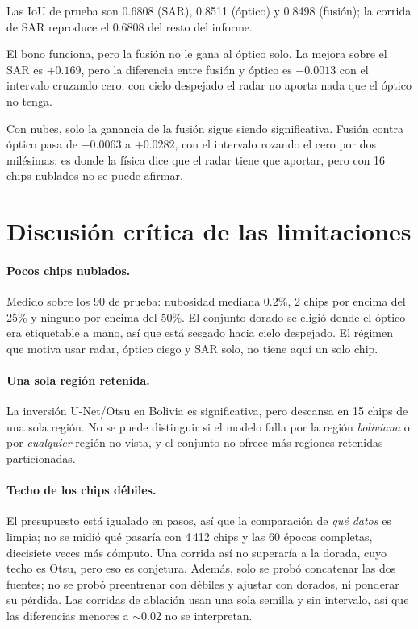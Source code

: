 \documentclass{article}
\begin{document}
Las IoU de prueba son 0.6808 (SAR), 0.8511 (óptico) y 0.8498 (fusión); la corrida
de SAR reproduce el 0.6808 del resto del informe.

El bono funciona, pero la fusión no le gana al óptico solo. La mejora sobre
el SAR es $+0.169$, pero la diferencia entre fusión y óptico es $-0.0013$ con el
intervalo cruzando cero: con cielo despejado el radar no aporta nada que el óptico
no tenga.

Con nubes, solo la ganancia de la fusión sigue siendo significativa. Fusión
contra óptico pasa de $-0.0063$ a $+0.0282$, con el intervalo rozando el cero por
dos milésimas: es donde la física dice que el radar tiene que aportar, pero con
16 chips nublados no se puede afirmar.

\section{Discusión crítica de las limitaciones}

\paragraph{Pocos chips nublados.}
Medido sobre los 90 de prueba: nubosidad mediana 0.2\%, 2 chips por
encima del 25\% y ninguno por encima del 50\%. El conjunto dorado se eligió
donde el óptico era etiquetable a mano, así que está sesgado hacia cielo
despejado. El régimen que motiva usar radar, óptico ciego y SAR solo, no tiene
aquí un solo chip.

\paragraph{Una sola región retenida.}
La inversión U-Net/Otsu en Bolivia es significativa, pero descansa en 15 chips de
una sola región. No se puede distinguir si el modelo falla por la región
\emph{boliviana} o por \emph{cualquier} región no vista, y el conjunto no ofrece
más regiones retenidas particionadas.

\paragraph{Techo de los chips débiles.}
El presupuesto está igualado en pasos, así que la comparación de \emph{qué datos}
es limpia; no se midió qué pasaría con 4\,412 chips y las 60 épocas completas,
diecisiete veces más cómputo. Una corrida así no superaría a la dorada, cuyo
techo es Otsu, pero eso es conjetura. Además, solo se probó concatenar las dos
fuentes; no se probó preentrenar con débiles y ajustar con dorados, ni ponderar
su pérdida. Las corridas de ablación usan una sola semilla y sin intervalo, así
que las diferencias menores a $\sim$0.02 no se interpretan.
\end{document}
